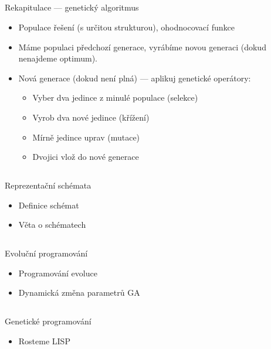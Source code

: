 \documentclass{beamer}
\begin{document}
\subsection{}
\begin{frame}{Rekapitulace --- genetický algoritmus}
\begin{itemize}
\item Populace řešení (s určitou strukturou), ohodnocovací funkce
\item Máme populaci předchozí generace, vyrábíme novou generaci (dokud nenajdeme optimum).
\item Nová generace (dokud není plná) --- aplikuj genetické operátory:
\begin{itemize}
\item Vyber dva jedince z minulé populace (selekce)
\item Vyrob dva nové jedince (křížení)
\item Mírně jedince uprav (mutace)
\item Dvojici vlož do nové generace
\end{itemize}
\end{itemize}
\end{frame}

\subsection{}
\begin{frame}{Reprezentační schémata}
\begin{itemize}
\item Definice schémat
\item Věta o schématech
\end{itemize}
\end{frame}

\subsection{}
\begin{frame}{Evoluční programování}
\begin{itemize}
\item Programování evoluce
\item Dynamická změna parametrů GA
\end{itemize}
\end{frame}

\subsection{}
\begin{frame}{Genetické programování}
\begin{itemize}
\item Rosteme LISP
\end{itemize}
\end{frame}
\end{document}
